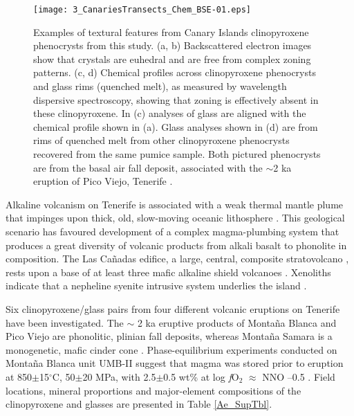 \documentclass[review,authoryear,12pt]{elsarticle}
\newcommand{\dgCs}{$^\circ$C}
\newcommand{\fO}{\textit{f}O$_{2}$ }
\begin{document}
         \begin{figure}[ht]
        \begin{center}
        \texttt{[image: 3\_CanariesTransects\_Chem\_BSE-01.eps]}
		\caption[Examples of textural features from Canary Islands clinopyroxene phenocrysts from this study, with chemical transects]{Examples of textural features from Canary Islands clinopyroxene phenocrysts from this study. (a, b) Backscattered electron images show that crystals are euhedral and are free from complex zoning patterns. (c, d) Chemical profiles across clinopyroxene phenocrysts and glass rims (quenched melt), as measured by wavelength dispersive spectroscopy, showing that zoning is effectively absent in these clinopyroxene. In (c) analyses of glass are aligned with the chemical profile shown in (a). Glass analyses shown in (d) are from rims of quenched melt from other clinopyroxene phenocrysts recovered from the same pumice sample. Both pictured phenocrysts are from the basal air fall deposit, associated with the $\sim$2 ka eruption of Pico Viejo, Tenerife \citep{Ablay1995}.
        }
        \label{3_ChemTransect}
        \end{center}
        \end{figure}

Alkaline volcanism on Tenerife is associated with a weak thermal mantle plume that impinges upon thick, old, slow-moving oceanic lithosphere \citep{Carracedo2007}. This geological scenario has favoured development of a complex magma-plumbing system that produces a great diversity of volcanic products from alkali basalt to phonolite in composition. The Las Ca\~nadas edifice, a large, central, composite stratovolcano \citep{Bryan1998,Brown2003,Edgar2007}, rests upon a base of at least three mafic alkaline shield volcanoes \citep{Thirlwall2000,Guillou2004,Gurenko2006}. Xenoliths indicate that a nepheline syenite intrusive system underlies the island \citep{Wiesmaier2012}.

Six clinopyroxene/glass pairs from four different volcanic eruptions on Tenerife have been investigated. The $\sim$ 2 ka eruptive products of Monta\~na Blanca and Pico Viejo \citep{Ablay1995} are phonolitic, plinian fall deposits, whereas Monta\~na Samara is a monogenetic, mafic cinder cone \citep{Albert2015}. Phase-equilibrium experiments conducted on Monta\~na Blanca unit UMB-II suggest that magma was stored prior to eruption at 850$\pm$15\dgCs, 50$\pm$20 MPa, with 2.5$\pm$0.5 wt\%  at log \fO $\approx$ NNO --0.5  \citep{Andujar2012}. Field locations, mineral proportions and major-element compositions of the clinopyroxene and glasses are presented in Table \ref{Ae_SupTbl}.
\end{document}
